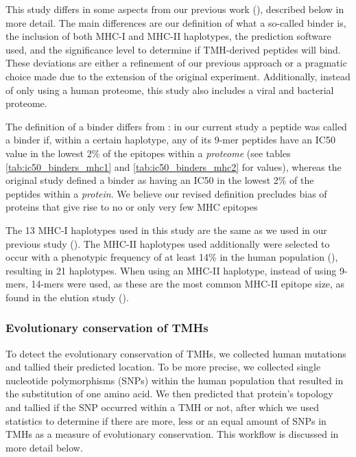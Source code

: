 This study differs in some aspects from our previous work (\cite{bianchi2017}), 
described below in more detail.
The main differences are our definition of what a so-called binder is, 
the inclusion of both MHC-I and MHC-II haplotypes, 
the prediction software used, 
and the significance level to determine if TMH-derived peptides will bind.
These deviations are either a refinement of our previous approach or
a pragmatic choice made due to the extension of the original experiment.
Additionally, instead of only using a human proteome, this study
also includes a viral and bacterial proteome.

The definition of a binder differs from \cite{bianchi2017}:
in our current study a peptide was called a binder if, within a certain haplotype, 
any of its 9-mer peptides have an IC50 value in the lowest 2\% of 
the epitopes within a 
\emph{proteome} (see tables \ref{tab:ic50_binders_mhc1} and \ref{tab:ic50_binders_mhc2}
for values), whereas the original study defined
a binder as having an IC50 in the lowest 2\% 
of the peptides within a \emph{protein}.
We believe our revised definition precludes bias of proteins 
that give rise to no or only very few MHC epitopes

The 13 MHC-I haplotypes used in this study are the same as 
we used in our previous study (\cite{bianchi2017}).
The MHC-II haplotypes used additionally were selected 
to occur with a phenotypic frequency of at least 14\% in
the human population (\cite{greenbaum2011functional}),
resulting in 21 haplotypes.
When using an MHC-II haplotype, instead of using 9-mers, 14-mers were
used, as these are the most common MHC-II epitope size,
as found in the elution study (\cite{bergseng2015different}).

\subsubsection{Evolutionary conservation of TMHs}


To detect the evolutionary conservation of TMHs, 
we collected human mutations and 
tallied their predicted location.
To be more precise, we collected single nucleotide
polymorphisms (SNPs) within the human population
that resulted in the substitution of one amino acid.
We then predicted that protein's topology and tallied if
the SNP occurred within a TMH or not, 
after which we used statistics to determine if there are
more, less or an equal amount of SNPs in TMHs
as a measure of evolutionary conservation.
This workflow is discussed in more detail below.

